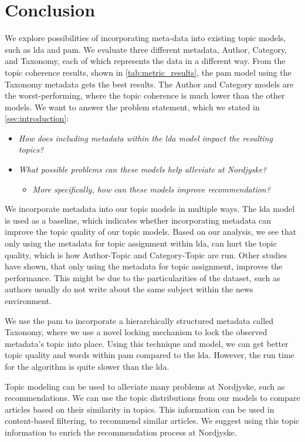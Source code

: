 \section{Conclusion}\label{sec:conclusion}
We explore possibilities of incorporating meta-data into existing topic models, such as \gls{lda} and \gls{pam}.
We evaluate three different metadata, Author, Category, and Taxonomy, each of which represents the data in a different way.
From the topic coherence results, shown in \autoref{tab:metric_results}, the \gls{pam} model using the Taxonomy metadata gets the best results.
The Author and Category models are the worst-performing, where the topic coherence is much lower than the other models.
We want to answer the problem statement, which we stated in \autoref{sec:introduction}:


\begin{itemize}
	\item \textit{How does including metadata within the \gls{lda} model impact the resulting topics?}
	\item \textit{What possible problems can these models help alleviate at Nordjyske?}
	\begin{itemize}
		\item \textit{More specifically, how can these models improve recommendation?}
	\end{itemize}
\end{itemize}

We incorporate metadata into our topic models in multiple ways.
The \gls{lda} model is used as a baseline, which indicates whether incorporating metadata can improve the topic quality of our topic models.
Based on our analysis, we see that only using the metadata for topic assignment within \gls{lda}, can hurt the topic quality, which is how Author-Topic and Category-Topic are run.
Other studies have shown, that only using the metadata for topic assignment, improves the performance.
This might be due to the particularities of the dataset, such as authors usually do not write about the same subject within the news environment.  


We use the \gls{pam} to incorporate a hierarchically structured metadata called Taxonomy, where we use a novel locking mechanism to lock the observed metadata's topic into place.
Using this technique and model, we can get better topic quality and words within \gls{pam} compared to the \gls{lda}.
However, the run time for the algorithm is quite slower than the \gls{lda}.


Topic modeling can be used to alleviate many problems at Nordjyske, such as recommendations.
We can use the topic distributions from our models to compare articles based on their similarity in topics. 
This information can be used in content-based filtering, to recommend similar articles.
We suggest using this topic information to enrich the recommendation process at Nordjyske. 
